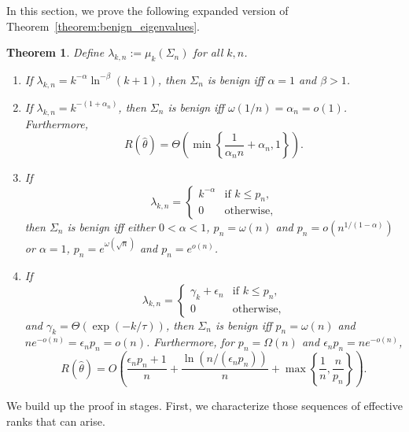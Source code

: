 \documentclass[11pt,notitlepage]{article}
\newtheorem{theorem}{Theorem}
\begin{document}
In this section, we prove the following expanded version of
Theorem~\ref{theorem:benign_eigenvalues}.
  \begin{theorem}\label{theorem:benign_eigenvalues_expanded}
    Define
     $\lambda_{k,n}:= \mu_k(\Sigma_n)$ for all $k,n$.
    \begin{enumerate}
      \item\label{eigenexample_expanded:infdim}
        If $\lambda_{k,n} = k^{-\alpha} \ln^{-\beta} (k+1)$, then
        $\Sigma_n$ is benign iff $\alpha=1$ and
        $\beta > 1$.
      \item\label{eigenexample_expanded:exponent}
        If $\lambda_{k,n} = k^{-(1+\alpha_n)}$, then
        $\Sigma_n$ is benign iff $\omega(1/n)=\alpha_n=o(1)$.
        Furthermore,
          \[
            R(\hat\theta)
              = \Theta\left(\min\left\{\frac{1}{\alpha_nn}
              +\alpha_n,1\right\}\right).
          \]
      \item\label{eigenexample_expanded:finitepoly}
        If
          \[
            \lambda_{k,n} = \begin{cases}
              k^{-\alpha} & \text{if $k\le p_n$,} \\
              0   & \text{otherwise,}
              \end{cases}
          \]
        then $\Sigma_n$ is benign iff either $0<\alpha<1$,
        $p_n=\omega(n)$ and $p_n=o\left(n^{1/(1-\alpha)}\right)$ or
        $\alpha=1$, $p_n = e^{\omega(\sqrt{n})}$ and  $p_n = e^{o(n)}$.
      \item\label{eigenexample_expanded:expplusconst}
        If
          \[
            \lambda_{k,n} = \begin{cases}
              \gamma_k + \epsilon_n & \text{if $k\le p_n$,} \\
              0   & \text{otherwise,}
              \end{cases}
          \]
        and $\gamma_k=\Theta(\exp(-k/\tau))$,
        then $\Sigma_n$ is benign iff $p_n=\omega(n)$ and
        $ne^{-o(n)}=\epsilon_np_n=o(n)$.
        Furthermore, for $p_n=\Omega(n)$ and
        $\epsilon_np_n=ne^{-o(n)}$,
          \[
            R(\hat\theta)
              = O\left(\frac{\epsilon_np_n+1}{n}
              + \frac{\ln(n/(\epsilon_np_n))}{n}
              + \max\left\{\frac{1}{n},\frac{n}{p_n}\right\}\right).
          \]
    \end{enumerate}
  \end{theorem}

We build up the proof in stages.  First, we characterize those
sequences of effective ranks that can arise.
\end{document}
